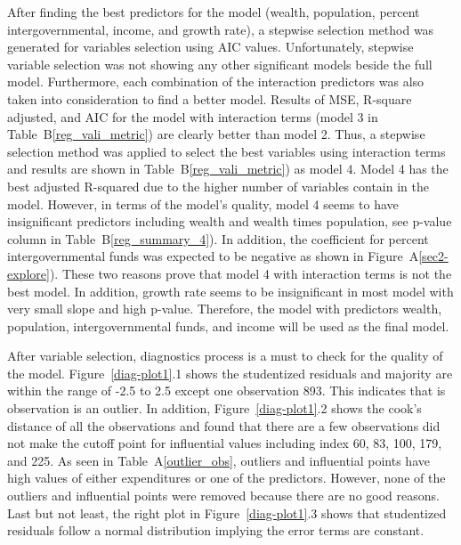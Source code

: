 \documentclass[11pt]{article}\usepackage[]{graphicx}\usepackage[]{color}
\begin{document}
\noindent After finding the best predictors for the model (wealth, population, percent intergovernmental, income, and growth rate), a stepwise selection method was generated for variables selection using AIC values. Unfortunately, stepwise variable selection was not showing any other significant models beside the full model. Furthermore, each combination of the interaction predictors was also taken into consideration to find a better model. Results of MSE, R-square adjusted, and AIC for the model with interaction terms (model 3 in Table~B\ref{reg_vali_metric}) are clearly better than model 2. Thus, a stepwise selection method was applied to select the best variables using interaction terms and results are shown in Table~B\ref{reg_vali_metric}) as model 4. Model 4 has the best adjusted R-squared due to the higher number of variables contain in the model. However, in terms of the model's quality, model 4 seems to have insignificant predictors including wealth and wealth times population, see p-value column in Table~B\ref{reg_summary_4}). In addition, the coefficient for percent intergovernmental funds was expected to be negative as shown in Figure~A\ref{sec2-explore}). These two reasons prove that model 4 with interaction terms is not the best model. In addition, growth rate seems to be insignificant in most model with very small slope and high p-value. Therefore, the model with predictors wealth, population, intergovernmental funds, and income will be used as the final model.
\hfill \break

\noindent After variable selection, diagnostics process is a must to check for the quality of the model. Figure~\ref{diag-plot1}.1 shows the studentized residuals and majority are within the range of -2.5 to 2.5 except one observation 893. This indicates that is observation is an outlier. In addition, Figure~\ref{diag-plot1}.2 shows the cook's distance of all the observations and found that there are a few observations did not make the cutoff point for influential values including index 60, 83, 100, 179, and 225. As seen in Table~A\ref{outlier_obs}, outliers and influential points have high values of either expenditures or one of the predictors. However, none of the outliers and influential points were removed because there are no good reasons. Last but not least, the right plot in Figure~\ref{diag-plot1}.3 shows that studentized residuals follow a normal distribution implying the error terms are constant.    
\hfill \break
\end{document}
